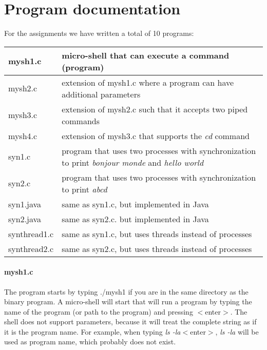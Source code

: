 \documentclass[a4paper,10pt]{article}
\begin{document}
\section{Program documentation}
For the assignments we have written a total of 10 programs:
\begin{center}
\begin{tabular}{ l | p{9cm} }
mysh1.c & micro-shell that can execute a command (program) \\ \hline
mysh2.c & extension of mysh1.c where a program can have additional parameters \\ \hline
mysh3.c & extension of mysh2.c such that it accepts two piped commands \\ \hline
mysh4.c & extension of mysh3.c that supports the \emph{cd} command \\ \hline
syn1.c & program that uses two processes with synchronization to print \emph{bonjour monde} and \emph{hello world} \\ \hline
syn2.c & program that uses two processes with synchronization to print \emph{abcd} \\ \hline
syn1.java & same as syn1.c, but implemented in Java \\ \hline
syn2.java & same as syn2.c. but implemented in Java \\ \hline
synthread1.c & same as syn1.c, but uses threads instead of processes \\ \hline
synthread2.c & same as syn2.c, but uses threads instead of processes
\end{tabular}
\end{center}
\paragraph{mysh1.c} The program starts by typing ./mysh1 if you are in the same directory as the binary program. A micro-shell will start that will run a program by typing the name of the program (or path to the program) and pressing $<$enter$>$. The shell does not support parameters, because it will treat the complete string as if it is the program name. For example, when typing \emph{ls -la}$<$enter$>$, \emph{ls -la} will be used as program name, which probably does not exist.
\end{document}

